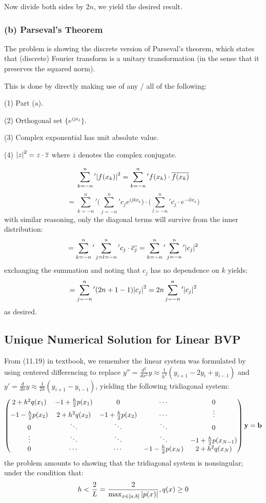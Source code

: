 \documentclass[12pt]{article} %
\newcommand{\1}[1]{\mathds{1}\left[#1\right]}
\begin{document}
Now divide both sides by $2n$, we yield the desired result.

\subsubsection{(b) Parseval's Theorem}
The problem is showing the discrete version of Parseval's theorem, which states that (discrete) Fourier transform is a unitary transformation (in the sense that it preserves the squared norm).

This is done by directly making use of any / all of the following:

(1) Part (a).

(2) Orthogonal set $\{e^{ijx_k}\}$.

(3) Complex exponential has unit absolute value.

(4) $\abs{z}^2 = z\cdot \overline{z}$ where $\overline{z}$ denotes the complex conjugate.

$$
	\sum_{k=-n}^n{'}\abs{f(x_k)}^2 = \sum_{k=-n}^n{'}f(x_k)\cdot\overline{f(x_k)}
$$
$$
	= \sum_{k=-n}^n{'}\bigg(
	\sum_{j=-n}^n{'}c_je^{ijkx_k}
	\bigg)\cdot
	\bigg(
	\sum_{l=-n}^n{'}\overline{c_j}\cdot e^{-ilx_k}
	\bigg)
$$ with similar reasoning, only the diagonal terms will survive from the inner distribution:
$$
	= \sum_{k=-n}^n{'}\sum_{j=l=-n}^{n}{'}c_j\cdot\overline{c_j} = \sum_{k=-n}^n{'}\sum_{j=-n}^n{'}\abs{c_j}^2
$$ exchanging the summation and noting that $c_j$ has no dependence on $k$ yields:
$$
	= \sum_{j=-n}^n{'}(2n+1-1)\abs{c_j}^2 = 2n\sum_{j=-n}^n{'}\abs{c_j}^2
$$ as desired.
\newpage
\subsection{Unique Numerical Solution for Linear BVP}
From (11.19) in textbook, we remember the linear system was formulated by using centered differencing to replace $y'' = \frac{d^2}{dx^2}y\approx \frac{1}{h^2}(y_{i+1} - 2y_i+ y_{i-1})$ and $y' = \frac{d}{dx}y \approx \frac{1}{2h}(y_{i+1}-  y_{i-1})$, yielding the following tridiagonal system:
$$
	\begin{pmatrix}
	2+h^2q(x_1) & -1+\frac{h}{2}p(x_1) & 0 & \cdots & 0 \\
	-1-\frac{h}{2}p(x_2) & 2+h^2q(x_2) & -1 + \frac{h}{2}p(x_2) & \cdots & \vdots\\
	0 & \ddots & \ddots & \ddots & 0 \\
	\vdots & \ddots & \ddots & \ddots & -1+\frac{h}{2}p(x_{N-1}) \\
	0 & \cdots & \cdots & -1-\frac{h}{2}p(x_N) & 2+h^2q(x_N)
	\end{pmatrix}\bf{y} = \bf{b}
$$ the problem amounts to showing that the tridiagonal system is nonsingular; under the condition that:
$$
	h < \frac{2}{L} = \frac{2}{\max_{x\in[a,b]}\abs{p(x)}}, q(x)\ge 0
$$ 
\end{document}
